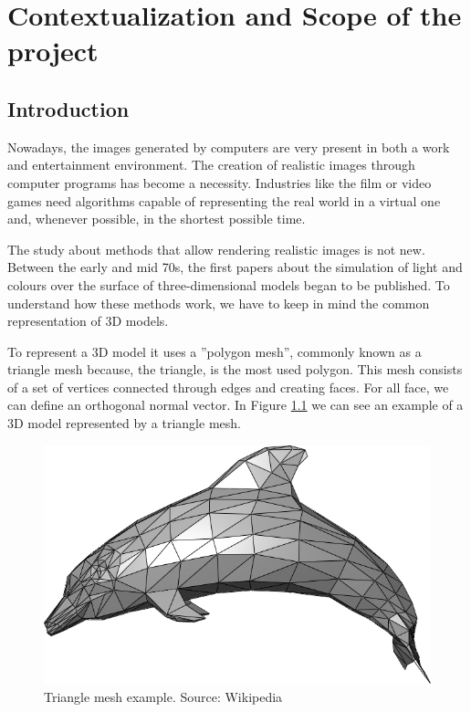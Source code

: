 \documentclass[titlepage,12pt]{report}
\begin{document}
\iftrue

\newpage
\tableofcontents*
\fi

\newpage

\chapter{Contextualization and Scope of the project}

\section{Introduction} \label{introduction}

Nowadays, the images generated by computers are very present in both a work and entertainment environment. The creation of realistic images through computer programs has become a necessity. Industries like the film or video games need algorithms capable of representing the real world in a virtual one and, whenever possible, in the shortest possible time.

The study about methods that allow rendering realistic images is not new. Between the early and mid 70s, the first papers about the simulation of light and colours over the surface of three-dimensional models began to be published. To understand how these methods work, we have to keep in mind the common representation of 3D models.

To represent a 3D model it uses a ''polygon mesh'', commonly known as a triangle mesh because, the triangle, is the most used polygon. This mesh consists of a set of vertices connected through edges and creating faces.  For all face, we can define an orthogonal normal vector. In Figure \ref{dolphin} we can see an example of a 3D model represented by a triangle mesh.

\begin{figure}[H]
	\centering
	\includegraphics[scale=0.15]{media/Dolphin_triangle_mesh.png}
	\caption{Triangle mesh example. Source: Wikipedia}
	\label{dolphin}
\end{figure}
\end{document}

